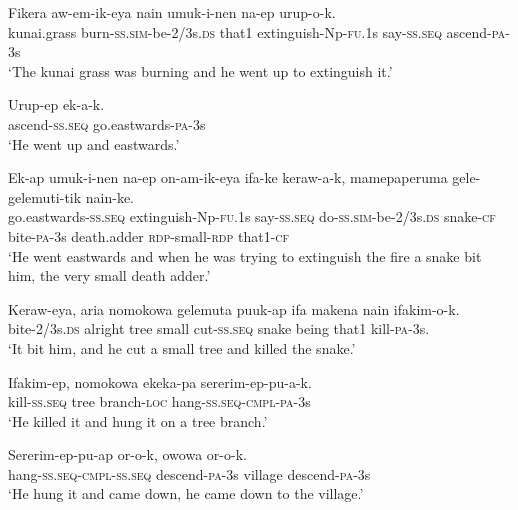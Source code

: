 \ea\label{ex:a:x3}
\gll  Fikera  aw-em-ik-eya  nain  umuk-i-nen                       na-ep  urup-o-k. \\
kunai.grass  burn-\textsc{ss}.\textsc{sim}-be-2/3s.\textsc{ds}  that1  extinguish-Np-\textsc{fu}.1s    say-\textsc{ss.seq}  ascend-\textsc{pa}-3s \\
\glt ‘The kunai grass was burning and he went up to extinguish it.’ \\
\z


\ea\label{ex:a:x4}
\gll  Urup-ep  ek-a-k. \\
ascend-\textsc{ss.seq}  go.eastwards-\textsc{pa}-3s \\
\glt ‘He went up and eastwards.’ \\
\z


\ea\label{ex:a:x5}
\gll  Ek-ap  umuk-i-nen  na-ep                        on-am-ik-eya  ifa-ke  keraw-a-k,  mamepaperuma             gele-gelemuti-tik  nain-ke. \\
go.eastwards-\textsc{ss.seq}  extinguish-Np-\textsc{fu}.1s  say-\textsc{ss.seq}  do-\textsc{ss}.\textsc{sim}-be-2/3s.\textsc{ds}  snake-\textsc{cf}  bite-\textsc{pa}-3s  death.adder    \textsc{rdp}-small-\textsc{rdp}  that1-\textsc{cf} \\




\glt ‘He went eastwards and when he was trying to extinguish the fire a snake bit him, the very small death adder.’ \\
\z


\ea\label{ex:a:x6}
\gll  Keraw-eya,  aria  nomokowa  gelemuta  puuk-ap  ifa  makena  nain  ifakim-o-k. \\
bite-2/3s.\textsc{ds}  alright  tree  small  cut-\textsc{ss.seq}  snake  being      that1  kill-\textsc{pa}-3s. \\


\glt ‘It bit him, and he cut a small tree and killed the snake.’ \\
\z


\ea\label{ex:a:x7}
\gll  Ifakim-ep,  nomokowa  ekeka-pa  sererim-ep-pu-a-k. \\
kill-\textsc{ss.seq}  tree  branch-\textsc{loc}  hang-\textsc{ss.seq}-\textsc{cmpl}-\textsc{pa}-3s \\
\glt ‘He killed it and hung it on a tree branch.’ \\
\z


\ea\label{ex:a:x8}
\gll  Sererim-ep-pu-ap  or-o-k,  owowa  or-o-k. \\
hang-\textsc{ss.seq}-\textsc{cmpl}-\textsc{ss.seq}  descend-\textsc{pa}-3s  village  descend-\textsc{pa}-3s \\
\glt ‘He hung it and came down, he came down to the village.’ \\
\z


